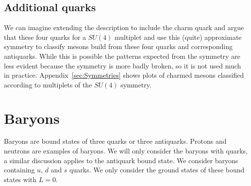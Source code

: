 \documentclass[12pt]{article}
\begin{document}
\subsection{Additional quarks}
We can imagine extending the description to include the charm quark and argue that these four quarks for a $SU(4)$ multiplet and use this (quite) approximate symmetry to classify mesons build from these four quarks and corresponding antiquarks. While this is possible the patterns expected from the symmetry are less evident because the symmetry is more badly broken, so it is not used much in practice. Appendix~\ref{sec:Symmetries} shows plots of charmed mesons classified according to multiplets of the $SU(4)$ symmetry. 
\clearpage
\section{Baryons}
Baryons are bound states of three quarks or three antiquarks. Protons and neutrons are examples of baryons. We will only consider the baryons with quarks, a similar discussion applies to the antiquark bound state. We consider baryons containing $u$, $d$ and $s$ quarks. We only consider the ground states of these bound states with $L=0$.
\end{document}
